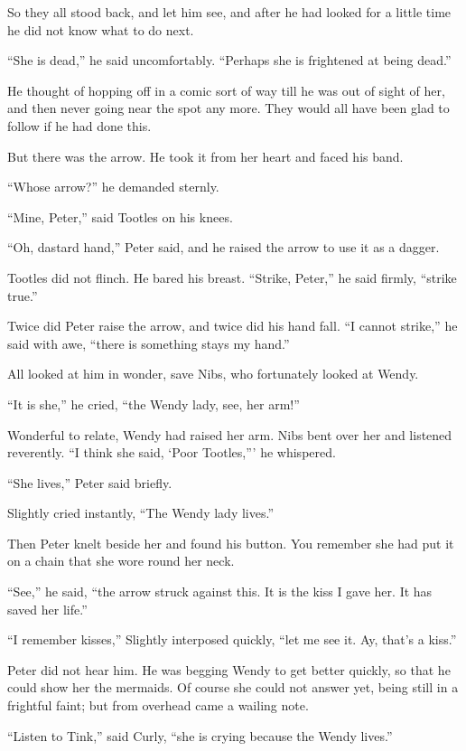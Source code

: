 So they all stood back, and let him see, and after he had looked for a
little time he did not know what to do next.

``She is dead,'' he said uncomfortably. ``Perhaps she is frightened at
being dead.''

He thought of hopping off in a comic sort of way till he was out of
sight of her, and then never going near the spot any more. They would
all have been glad to follow if he had done this.

But there was the arrow. He took it from her heart and faced his band.

``Whose arrow?'' he demanded sternly.

``Mine, Peter,'' said Tootles on his knees.

``Oh, dastard hand,'' Peter said, and he raised the arrow to use it as a
dagger.

Tootles did not flinch. He bared his breast. ``Strike, Peter,'' he said
firmly, ``strike true.''

Twice did Peter raise the arrow, and twice did his hand fall. ``I cannot
strike,'' he said with awe, ``there is something stays my hand.''

All looked at him in wonder, save Nibs, who fortunately looked at
Wendy.

``It is she,'' he cried, ``the Wendy lady, see, her arm!''

Wonderful to relate, Wendy had raised her arm. Nibs bent over her and
listened reverently. ``I think she said, ‘Poor Tootles,''' he whispered.

``She lives,'' Peter said briefly.

Slightly cried instantly, ``The Wendy lady lives.''

Then Peter knelt beside her and found his button. You remember she had
put it on a chain that she wore round her neck.

``See,'' he said, ``the arrow struck against this. It is the kiss I gave
her. It has saved her life.''

``I remember kisses,'' Slightly interposed quickly, ``let me see it. Ay,
that's a kiss.''

Peter did not hear him. He was begging Wendy to get better quickly, so
that he could show her the mermaids. Of course she could not answer
yet, being still in a frightful faint; but from overhead came a wailing
note.

``Listen to Tink,'' said Curly, ``she is crying because the Wendy lives.''

